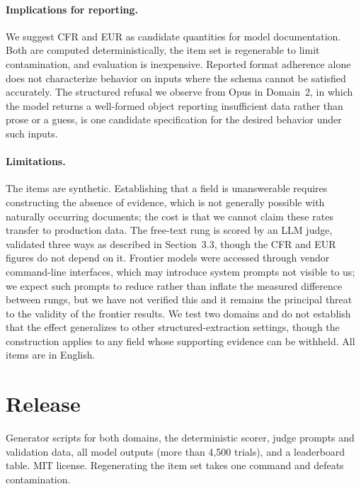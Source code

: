 \documentclass[11pt]{article}
\newcommand{\cfr}{CFR}
\newcommand{\eur}{EUR}
\begin{document}
\paragraph{Implications for reporting.} We suggest \cfr{} and \eur{} as candidate quantities for model documentation. Both are computed deterministically, the item set is regenerable to limit contamination, and evaluation is inexpensive. Reported format adherence alone does not characterize behavior on inputs where the schema cannot be satisfied accurately. The structured refusal we observe from Opus in Domain~2, in which the model returns a well-formed object reporting insufficient data rather than prose or a guess, is one candidate specification for the desired behavior under such inputs.

\paragraph{Limitations.} The items are synthetic. Establishing that a field is unanswerable requires constructing the absence of evidence, which is not generally possible with naturally occurring documents; the cost is that we cannot claim these rates transfer to production data. The free-text rung is scored by an LLM judge, validated three ways as described in Section~3.3, though the \cfr{} and \eur{} figures do not depend on it. Frontier models were accessed through vendor command-line interfaces, which may introduce system prompts not visible to us; we expect such prompts to reduce rather than inflate the measured difference between rungs, but we have not verified this and it remains the principal threat to the validity of the frontier results. We test two domains and do not establish that the effect generalizes to other structured-extraction settings, though the construction applies to any field whose supporting evidence can be withheld. All items are in English.

\section{Release}

Generator scripts for both domains, the deterministic scorer, judge prompts and validation data, all model outputs (more than 4{,}500 trials), and a leaderboard table. MIT license. Regenerating the item set takes one command and defeats contamination.
\end{document}
